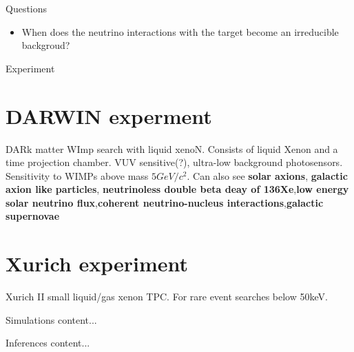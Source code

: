 \documentclass[10pt,a4paper]{book}
\begin{document}
	\begin{chapter}{Questions}
		\begin{itemize}
		\item When does the neutrino interactions with the target become an irreducible backgroud?
	\end{itemize}
		
		
	\end{chapter}

	\begin{chapter}{Experiment}
		\section{DARWIN experment}
		DARk matter WImp search with liquid xenoN. Consists of liquid Xenon and a time projection chamber. 
		VUV sensitive(?), ultra-low background photosensors. 
		Sensitivity to WIMPs above mass $5GeV/c^2$.
		Can also see \textbf{solar axions}, \textbf{galactic axion like particles}, \textbf{neutrinoless double beta deay of 136Xe},\textbf{low energy solar neutrino flux},\textbf{coherent neutrino-nucleus interactions},\textbf{galactic supernovae}
	\section{Xurich experiment}
	
	Xurich II small liquid/gas xenon TPC. For rare event searches below 50keV. 
	
	
		
	\end{chapter}

	\begin{chapter}{Simulations}
		content...
	\end{chapter}

	\begin{chapter}{Inferences}
		content...
	\end{chapter}


	

	
\end{document}
